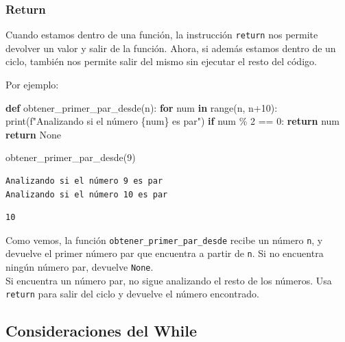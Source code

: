 \documentclass[
  letterpaper,
  DIV=11,
  numbers=noendperiod]{scrreprt}
\newenvironment{Shaded}{\begin{snugshade}}{\end{snugshade}}
\newcommand{\BuiltInTok}[1]{\textcolor[rgb]{0.00,0.23,0.31}{#1}}
\newcommand{\ControlFlowTok}[1]{\textcolor[rgb]{0.00,0.23,0.31}{\textbf{#1}}}
\newcommand{\DecValTok}[1]{\textcolor[rgb]{0.68,0.00,0.00}{#1}}
\newcommand{\KeywordTok}[1]{\textcolor[rgb]{0.00,0.23,0.31}{\textbf{#1}}}
\newcommand{\NormalTok}[1]{\textcolor[rgb]{0.00,0.23,0.31}{#1}}
\newcommand{\OperatorTok}[1]{\textcolor[rgb]{0.37,0.37,0.37}{#1}}
\newcommand{\SpecialCharTok}[1]{\textcolor[rgb]{0.37,0.37,0.37}{#1}}
\newcommand{\SpecialStringTok}[1]{\textcolor[rgb]{0.13,0.47,0.30}{#1}}
\newcommand{\VariableTok}[1]{\textcolor[rgb]{0.07,0.07,0.07}{#1}}
\begin{document}
\subsubsection{Return}\label{return}

Cuando estamos dentro de una función, la instrucción \texttt{return} nos
permite devolver un valor y salir de la función. Ahora, si además
estamos dentro de un ciclo, también nos permite salir del mismo sin
ejecutar el resto del código.

Por ejemplo:

\begin{Shaded}
\begin{Highlighting}[]
\KeywordTok{def}\NormalTok{ obtener\_primer\_par\_desde(n):}
  \ControlFlowTok{for}\NormalTok{ num }\KeywordTok{in} \BuiltInTok{range}\NormalTok{(n, n}\OperatorTok{+}\DecValTok{10}\NormalTok{):}
    \BuiltInTok{print}\NormalTok{(}\SpecialStringTok{f"Analizando si el número }\SpecialCharTok{\{}\NormalTok{num}\SpecialCharTok{\}}\SpecialStringTok{ es par"}\NormalTok{)}
    \ControlFlowTok{if}\NormalTok{ num }\OperatorTok{\%} \DecValTok{2} \OperatorTok{==} \DecValTok{0}\NormalTok{:}
      \ControlFlowTok{return}\NormalTok{ num}
  \ControlFlowTok{return} \VariableTok{None}
\end{Highlighting}
\end{Shaded}

\begin{Shaded}
\begin{Highlighting}[]
\NormalTok{obtener\_primer\_par\_desde(}\DecValTok{9}\NormalTok{)}
\end{Highlighting}
\end{Shaded}

\begin{verbatim}
Analizando si el número 9 es par
Analizando si el número 10 es par
\end{verbatim}

\begin{verbatim}
10
\end{verbatim}

Como vemos, la función \texttt{obtener\_primer\_par\_desde} recibe un
número \texttt{n}, y devuelve el primer número par que encuentra a
partir de \texttt{n}. Si no encuentra ningún número par, devuelve
\texttt{None}.\\
Si encuentra un número par, no sigue analizando el resto de los números.
Usa \texttt{return} para salir del ciclo y devuelve el número
encontrado.

\subsection{Consideraciones del While}\label{consideraciones-del-while}
\end{document}
